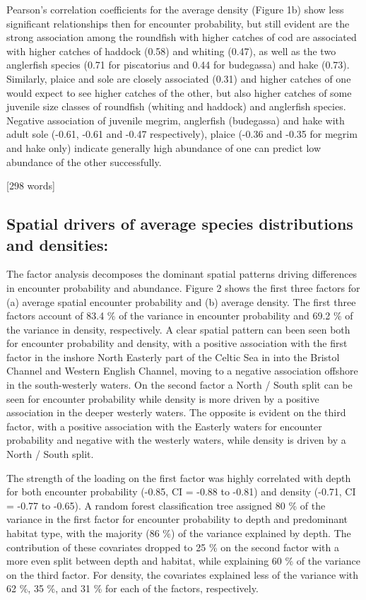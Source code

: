 \documentclass{nature}
\begin{document}
\begin{linenumbers}
Pearson's correlation coefficients for the average density (Figure 1b) show
less significant relationships then for encounter probability, but still
evident are the strong association among the roundfish with higher catches of
cod are associated with higher catches of haddock (0.58) and whiting (0.47), as
well as the two anglerfish species (0.71 for piscatorius and 0.44 for
budegassa) and hake (0.73). Similarly, plaice and sole are closely associated
(0.31) and higher catches of one would expect to see higher catches of the
other, but also higher catches of some juvenile size classes of roundfish
(whiting and haddock) and anglerfish species. Negative association of juvenile
megrim, anglerfish (budegassa) and hake with adult sole (-0.61, -0.61 and -0.47
respectively), plaice (-0.36 and -0.35 for megrim and hake only) indicate
generally high abundance of one can predict low abundance of the other
successfully.

[298 words]

\subsection{Spatial drivers of average species distributions and densities:}
The factor analysis decomposes the dominant spatial patterns driving
differences in encounter probability and abundance. Figure 2 shows the first
three factors for (a) average spatial encounter probability and (b) average
density. The first three factors account of 83.4 \% of the variance in
encounter probability and 69.2 \% of the variance in density, respectively. A
clear spatial pattern can been seen both for encounter probability and density,
with a positive association with the first factor in the inshore North Easterly
part of the Celtic Sea in into the Bristol Channel and Western English Channel,
moving to a negative association offshore in the south-westerly waters. On the
second factor a North / South split can be seen for encounter probability while
density is more driven by a positive association in the deeper westerly waters.
The opposite is evident on the third factor, with a positive association with
the Easterly waters for encounter probability and negative with the westerly
waters, while density is driven by a North / South split.

The strength of the loading on the first factor was highly correlated with
depth for both encounter probability (-0.85, CI = -0.88 to -0.81) and density
(-0.71, CI = -0.77 to -0.65). A random forest classification tree assigned 80
\% of the variance in the first factor for encounter probability to depth and
predominant habitat type, with the majority (86 \%) of the variance explained
by depth. The contribution of these covariates dropped to 25 \% on the second
factor with a more even split between depth and habitat, while explaining 60 \%
of the variance on the third factor. For density, the covariates explained less
of the variance with 62 \%, 35 \%, and 31 \% for each of the factors,
respectively.


\end{linenumbers}
\end{document}
